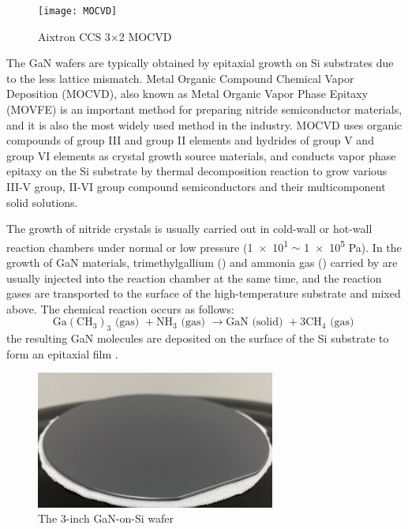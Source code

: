 \begin{figure}[H] 
\centering    
\texttt{[image: MOCVD]}
\caption[Aixtron CCS 3×2 MOCVD]{Aixtron CCS 3×2 MOCVD}
\label{fig:MOCVD}
\end{figure}

The GaN wafers  are typically obtained by epitaxial growth  on Si substrates  due to the less  lattice mismatch. Metal  Organic Compound Chemical Vapor Deposition (MOCVD), also known as Metal Organic Vapor Phase Epitaxy (MOVFE) is an important method for preparing nitride  semiconductor materials, and it is also the most widely used method in the industry. MOCVD uses organic compounds of group III and group II elements and hydrides of group V and group VI elements as crystal  growth source materials, and conducts vapor phase epitaxy on the Si substrate by thermal decomposition reaction to grow various III-V group, II-VI group compound semiconductors and their multicomponent solid solutions.

The growth of nitride crystals  is usually carried out in cold-wall or hot-wall reaction chambers under normal or low pressure (\num{1e1} $\sim$ \num{1e5} \unit{\Pa}). In the  growth of GaN materials, trimethylgallium () and ammonia gas () carried by  are usually injected into the reaction chamber at the same time, and the reaction gases are transported to the surface of the high-temperature substrate  and mixed above. The chemical reaction occurs as follows:
\begin{equation}
\mathrm{Ga}\left(\mathrm{CH}_{3}\right)_{3} \text { (gas) }+\mathrm{NH}_{3} \text { (gas) } \rightarrow \mathrm{GaN} \text { (solid) }+3 \mathrm{CH}_{4} \text { (gas) }
\end{equation}
the resulting GaN molecules are deposited on the surface of the Si substrate to form an epitaxial film \cite{hao2016nitride}.

\begin{figure}[H] 
\centering    
\includegraphics[width=0.7\textwidth]{wafer}
\caption[The 3-inch GaN-on-Si wafer]{The 3-inch GaN-on-Si wafer}
\label{fig:wafer}
\end{figure}

